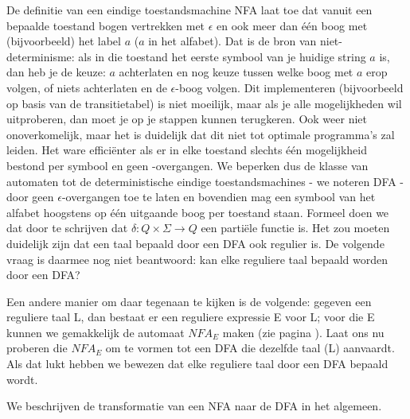 De definitie van een eindige toestandsmachine NFA laat toe dat vanuit een
bepaalde toestand bogen vertrekken met $\epsilon$ en ook meer dan
\'{e}\'{e}n boog met (bijvoorbeeld) het label $a$ ($a$ in het
alfabet). Dat is de bron van niet-determinisme: als in die toestand
het eerste symbool van je huidige string $a$ is, dan heb je de keuze: $a$
achterlaten en nog keuze tussen welke boog met $a$ erop volgen, of niets
achterlaten en de $\epsilon$-boog volgen. Dit implementeren
(bijvoorbeeld op basis van de transitietabel) is niet moeilijk, maar
als je alle mogelijkheden wil uitproberen, dan moet je op je stappen
kunnen terugkeren. Ook weer niet onoverkomelijk, maar het is duidelijk
dat dit niet tot optimale programma's zal leiden. Het ware effici\"enter
als er in elke toestand slechts \'{e}\'{e}n mogelijkheid bestond per
symbool en geen \eps-overgangen. We beperken dus de klasse van
automaten tot de deterministische eindige toestandsmachines - we
noteren DFA - door geen $\epsilon$-overgangen toe te laten en
bovendien mag een symbool van het alfabet hoogstens op \'{e}\'{e}n
uitgaande boog per toestand staan. Formeel doen we dat door te
schrijven dat $\delta : Q \times \Sigma \rightarrow Q$ een parti\"ele
functie is. Het zou moeten duidelijk zijn dat een taal bepaald door een
DFA ook regulier is.  De volgende vraag is daarmee nog niet
beantwoord: kan elke reguliere taal bepaald worden door een DFA?  

Een andere manier om daar tegenaan te kijken is de volgende: gegeven
een reguliere taal L, dan bestaat er een reguliere expressie E voor L;
voor die E kunnen we gemakkelijk de automaat $NFA_E$ maken (zie pagina
\pageref{re2fsasec}). Laat ons nu proberen die $NFA_E$ om te vormen
tot een DFA die dezelfde taal (L) aanvaardt. Als dat lukt hebben we
bewezen dat elke reguliere taal door een DFA bepaald wordt.


We beschrijven de transformatie van een NFA naar de DFA in het algemeen.

\clearpage

